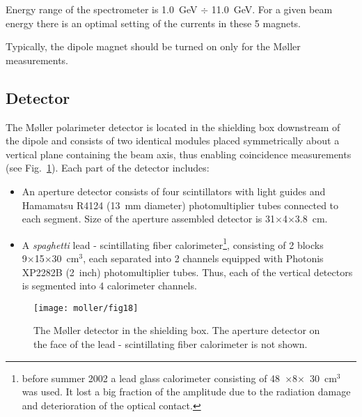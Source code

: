 {Energy range of the spectrometer is 1.0~GeV $\div$ 11.0~GeV. For a given beam 
energy there is an optimal setting of the currents in these 5 magnets. 

Typically, the dipole magnet should be turned on
only for the M{\o}ller measurements. 
\subsection {Detector}
\label{sec:moller_compon_det}
\vspace{-\parskip}
The M{\o}ller polarimeter detector is located in the shielding box downstream 
of the dipole and consists of two identical modules placed symmetrically about a 
vertical plane containing the beam axis, thus enabling coincidence measurements 
(see Fig.~\ref{fig:moller_detector}). Each part of the detector includes:
\vspace{-\parskip}
\begin{itemize}
 \item An aperture detector consists of four scintillators with light guides and 
       Hamamatsu R4124 (13~mm diameter) photomultiplier tubes connected to each segment. 
       Size of the aperture assembled detector is 31$\times$4$\times$3.8~cm.
  \item A {\it spaghetti} lead - scintillating fiber calorimeter\footnote{
         before summer 2002 a lead glass calorimeter consisting of 48~$\times$8$\times$~30~cm$^3$
         was used. It lost a big fraction of the amplitude due
         to the radiation damage and deterioration of the optical contact.},
         consisting of 2 blocks \\
         9$\times$15$\times$30~cm$^3$, each separated into 2
         channels equipped with Photonis XP2282B (2~inch) photomultiplier tubes. Thus,
         each of the vertical detectors is segmented into 4 calorimeter channels.
\end{itemize}

   \begin{figure}%
      \begin{center}
          \texttt{[image: moller/fig18]}
      \end{center}
      \caption[M{\o}ller:detector]{The M{\o}ller detector in the shielding box. 
               The aperture detector on the face of the lead - scintillating fiber 
               calorimeter is not shown. 
            }
      \label{fig:moller_detector} 
   \end{figure}  

}
